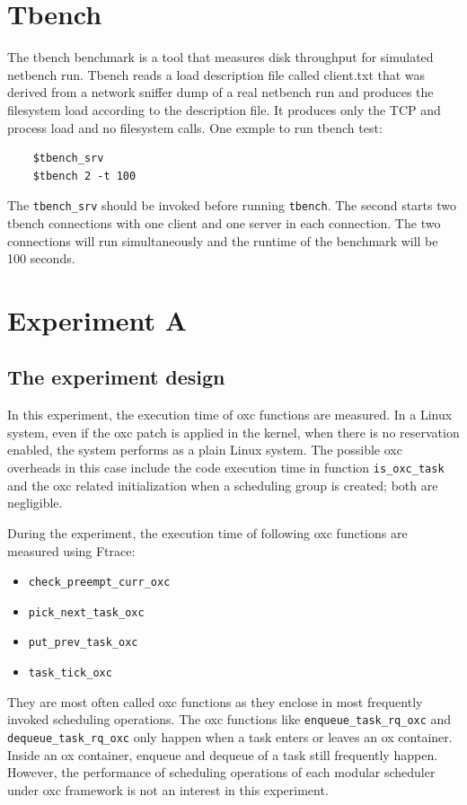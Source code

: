 \section{Tbench}
The tbench benchmark is a tool that measures disk throughput for simulated
netbench run. Tbench reads a load description file called client.txt that was
derived from a network sniffer dump of a real netbench run and produces the
filesystem load according to the description file. It produces only the TCP
and process load and no filesystem calls.
One exmple to run tbench test:
\begin{lstlisting}
	$tbench_srv
	$tbench 2 -t 100
\end{lstlisting}
The \texttt{tbench\_srv} should be invoked before running \texttt{tbench}.
The second starts two tbench connections with one client and one server in
each connection. The two connections will run simultaneously and the runtime
of the benchmark will be 100 seconds.

\section{Experiment A}
\subsection{The experiment design}
In this experiment, the execution time of oxc functions are measured.
In a Linux system, even if the oxc patch is applied in the kernel, when 
there is no reservation enabled, the system performs as a plain Linux system. 
The possible oxc overheads in this case include the code execution time in 
function \texttt{is\_oxc\_task} and the oxc related initialization when a 
scheduling group is created; both are negligible.

During the experiment, the execution time of following oxc functions are 
measured using Ftrace:
\begin{itemize} 
\item \texttt{check\_preempt\_curr\_oxc}
\item \texttt{pick\_next\_task\_oxc}
\item \texttt{put\_prev\_task\_oxc}
\item \texttt{task\_tick\_oxc}
\end{itemize} 
They are most often called oxc functions as they enclose in most frequently
invoked scheduling operations. The oxc functions like 
\texttt{enqueue\_task\_rq\_oxc} and \texttt{dequeue\_task\_rq\_oxc} only 
happen when a task enters or leaves an ox container. Inside an
ox container, enqueue and dequeue of a task still frequently happen.
However, the performance of scheduling operations of each modular
scheduler under oxc framework is not an interest in this experiment.


